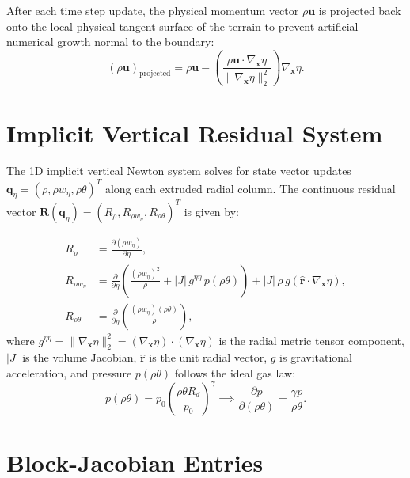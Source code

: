 \documentclass[11pt,a4paper]{article}
\begin{document}
After each time step update, the physical momentum vector $\rho \boldsymbol{u}$ is projected back onto the local physical tangent surface of the terrain to prevent artificial numerical growth normal to the boundary:
\begin{equation}
(\rho \boldsymbol{u})_{\text{projected}} = \rho \boldsymbol{u} - \left( \frac{\rho \boldsymbol{u} \cdot \nabla_{\boldsymbol{x}} \eta}{\|\nabla_{\boldsymbol{x}} \eta\|_2^2} \right) \nabla_{\boldsymbol{x}} \eta.
\end{equation}

\section{Implicit Vertical Residual System}

The 1D implicit vertical Newton system solves for state vector updates $\boldsymbol{q}_\eta = (\rho, \rho w_\eta, \rho \theta)^T$ along each extruded radial column. The continuous residual vector $\mathbf{R}(\boldsymbol{q}_\eta) = \left( R_\rho, R_{\rho w_\eta}, R_{\rho \theta} \right)^T$ is given by:

\begin{align}
R_\rho &= \frac{\partial (\rho w_\eta)}{\partial \eta}, \\[6pt]
R_{\rho w_\eta} &= \frac{\partial}{\partial \eta} \left( \frac{(\rho w_\eta)^2}{\rho} + |J| \, g^{\eta\eta} \, p(\rho\theta) \right) + |J| \, \rho \, g \left( \hat{\boldsymbol{r}} \cdot \nabla_{\boldsymbol{x}} \eta \right), \\[6pt]
R_{\rho \theta} &= \frac{\partial}{\partial \eta} \left( \frac{(\rho w_\eta)(\rho \theta)}{\rho} \right),
\end{align}
where $g^{\eta\eta} = \|\nabla_{\boldsymbol{x}} \eta\|_2^2 = (\nabla_{\boldsymbol{x}} \eta) \cdot (\nabla_{\boldsymbol{x}} \eta)$ is the radial metric tensor component, $|J|$ is the volume Jacobian, $\hat{\boldsymbol{r}}$ is the unit radial vector, $g$ is gravitational acceleration, and pressure $p(\rho\theta)$ follows the ideal gas law:
\begin{equation}
p(\rho\theta) = p_0 \left( \frac{\rho\theta R_d}{p_0} \right)^\gamma \implies \frac{\partial p}{\partial (\rho\theta)} = \frac{\gamma p}{\rho\theta}.
\end{equation}


\section{Block-Jacobian Entries}
\end{document}
